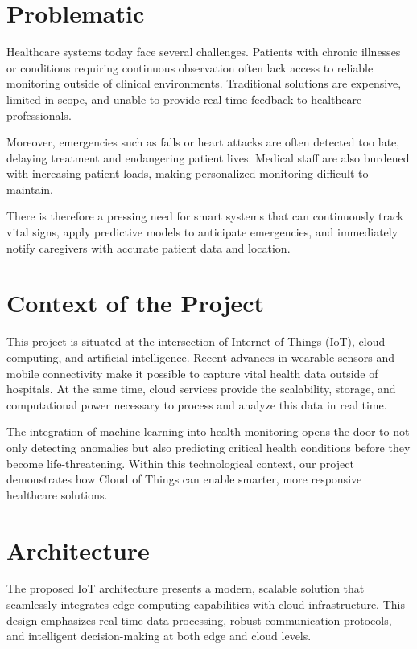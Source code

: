 \documentclass[12pt,a4paper]{article}
\begin{document}
\setcounter{page}{1}

\section{Problematic}

Healthcare systems today face several challenges. Patients with chronic illnesses or conditions requiring continuous observation often lack access to reliable monitoring outside of clinical environments. Traditional solutions are expensive, limited in scope, and unable to provide real-time feedback to healthcare professionals.

Moreover, emergencies such as falls or heart attacks are often detected too late, delaying treatment and endangering patient lives. Medical staff are also burdened with increasing patient loads, making personalized monitoring difficult to maintain.

There is therefore a pressing need for smart systems that can continuously track vital signs, apply predictive models to anticipate emergencies, and immediately notify caregivers with accurate patient data and location.

\section{Context of the Project}

This project is situated at the intersection of Internet of Things (IoT), cloud computing, and artificial intelligence. Recent advances in wearable sensors and mobile connectivity make it possible to capture vital health data outside of hospitals. At the same time, cloud services provide the scalability, storage, and computational power necessary to process and analyze this data in real time.

The integration of machine learning into health monitoring opens the door to not only detecting anomalies but also predicting critical health conditions before they become life-threatening. Within this technological context, our project demonstrates how Cloud of Things can enable smarter, more responsive healthcare solutions.

\section{Architecture}

The proposed IoT architecture presents a modern, scalable solution that seamlessly integrates edge computing capabilities with cloud infrastructure. This design emphasizes real-time data processing, robust communication protocols, and intelligent decision-making at both edge and cloud levels.
\end{document}
